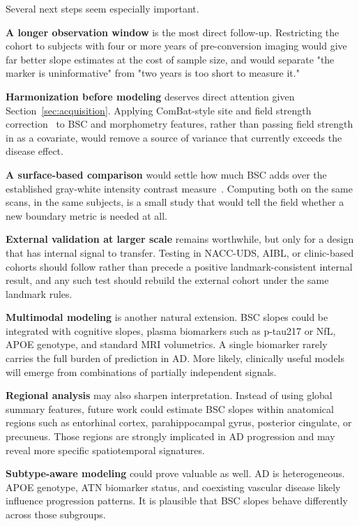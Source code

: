\documentclass[blue]{ludusofficial}  %
\begin{document}
Several next steps seem especially important.

\textbf{A longer observation window} is the most direct follow-up. Restricting the cohort to subjects with four or more years of pre-conversion imaging would give far better slope estimates at the cost of sample size, and would separate "the marker is uninformative" from "two years is too short to measure it."

\textbf{Harmonization before modeling} deserves direct attention given Section~\ref{sec:acquisition}. Applying ComBat-style site and field strength correction~\cite{fortin2018harmonization} to BSC and morphometry features, rather than passing field strength in as a covariate, would remove a source of variance that currently exceeds the disease effect.

\textbf{A surface-based comparison} would settle how much BSC adds over the established gray-white intensity contrast measure~\cite{salat2009age}. Computing both on the same scans, in the same subjects, is a small study that would tell the field whether a new boundary metric is needed at all.

\textbf{External validation at larger scale} remains worthwhile, but only for a design that has internal signal to transfer. Testing in NACC-UDS, AIBL, or clinic-based cohorts should follow rather than precede a positive landmark-consistent internal result, and any such test should rebuild the external cohort under the same landmark rules.

\textbf{Multimodal modeling} is another natural extension. BSC slopes could be integrated with cognitive slopes, plasma biomarkers such as p-tau217 or NfL, APOE genotype, and standard MRI volumetrics. A single biomarker rarely carries the full burden of prediction in AD. More likely, clinically useful models will emerge from combinations of partially independent signals.

\textbf{Regional analysis} may also sharpen interpretation. Instead of using global summary features, future work could estimate BSC slopes within anatomical regions such as entorhinal cortex, parahippocampal gyrus, posterior cingulate, or precuneus. Those regions are strongly implicated in AD progression and may reveal more specific spatiotemporal signatures.

\textbf{Subtype-aware modeling} could prove valuable as well. AD is heterogeneous. APOE genotype, ATN biomarker status, and coexisting vascular disease likely influence progression patterns. It is plausible that BSC slopes behave differently across those subgroups.
\end{document}
